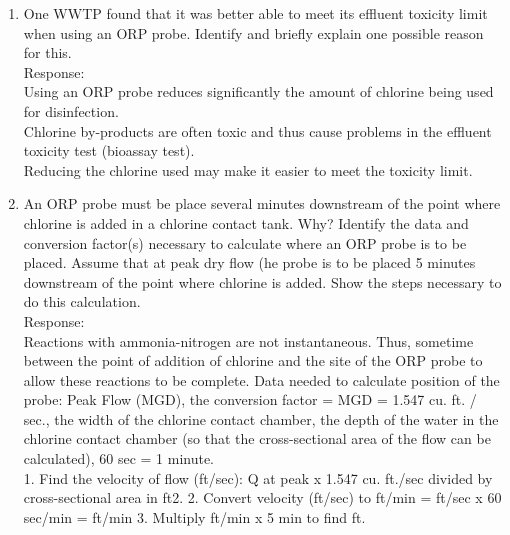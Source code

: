 \begin{enumerate}
\item One WWTP found that it was better able to meet its effluent toxicity limit when using an ORP probe.  Identify and briefly explain one possible reason for this.\\
\vspace{0.3cm}
Response:\\
\vspace{0.3cm}
Using an ORP probe reduces significantly the amount of chlorine being used for disinfection.  \\
Chlorine by-products are often toxic and thus cause problems in the effluent toxicity test (bioassay test).  \\
Reducing the chlorine used may make it easier to meet the toxicity limit.\\


\item An ORP probe must be place several minutes downstream of the point where chlorine is added in a chlorine contact tank.  Why?  Identify the data and conversion factor(s) necessary to calculate where an ORP probe is to be placed.  Assume that at peak dry flow (he probe is to be placed 5 minutes downstream of the point where chlorine is added.  Show the steps necessary to do this calculation.\\
\vspace{0.3cm}
Response:\\
\vspace{0.3cm}
Reactions with ammonia-nitrogen are not instantaneous.  Thus, sometime between the point of addition of chlorine and the site of the ORP probe to allow these reactions to be complete.
Data needed to calculate position of the probe: Peak Flow (MGD), the conversion factor = MGD = 1.547 cu. ft. / sec., the width of the chlorine contact chamber, the depth of the water in the chlorine contact chamber (so that the cross-sectional area of the flow can be calculated), 60 sec = 1 minute.\\

1.  Find the velocity of flow (ft/sec): Q at peak x 1.547 cu. ft./sec divided by cross-sectional area in ft2.
2.  Convert velocity (ft/sec) to ft/min = ft/sec x 60 sec/min = ft/min
3.  Multiply ft/min x 5 min to find ft.









\end{enumerate}





